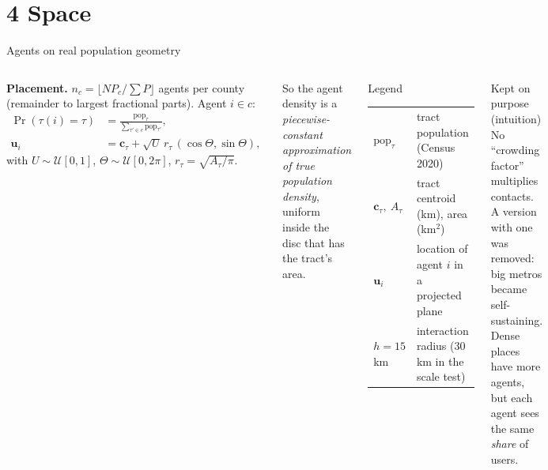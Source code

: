 ﻿\documentclass[9pt,aspectratio=169]{beamer}
\newenvironment{kept}{\begin{exampleblock}{Kept on purpose (intuition)}\small}{\end{exampleblock}}
\newenvironment{legend}{\begin{block}{Legend}\scriptsize}{\end{block}}
\begin{document}
\section{4 Space}
\begin{frame}{Agents on real population geometry}
 \begin{columns}[T]
 \textbf{Placement.} $n_c=\big\lfloor N P_c/\sum P\big\rfloor$ agents per county (remainder to largest fractional parts). Agent $i\in c$:
 \begin{align*}
 \Pr(\tau(i)=\tau)&=\frac{\mathrm{pop}_\tau}{\sum_{\tau'\in c}\mathrm{pop}_{\tau'}},\\
 \bm u_i&=\bm c_\tau+\sqrt{U}\,r_\tau\,(\cos\Theta,\sin\Theta),
 \end{align*}
 with $U\sim\mathcal U[0,1]$, $\Theta\sim\mathcal U[0,2\pi]$, $r_\tau=\sqrt{A_\tau/\pi}$.
 \par\smallskip
 So the agent density is a \emph{piecewise-constant approximation of true population density}, uniform inside the disc that has the tract's area.
 \begin{legend}
 \begin{tabular}{@{}p{1.1cm}p{5.2cm}@{}}
 $\mathrm{pop}_\tau$ & tract population (Census 2020)\\
 $\bm c_\tau,\ A_\tau$ & tract centroid (km), area (km$^2$)\\
 $\bm u_i$ & location of agent $i$ in a projected plane\\
 $h=15$ km & interaction radius (30 km in the scale test)
 \end{tabular}
 \end{legend}
 \begin{kept}
  No ``crowding factor'' multiplies contacts. A version with one was removed: big metros became self-sustaining. Dense places have more agents, but each agent sees the same \emph{share} of users.
 \end{kept}
 \end{columns}
\end{frame}
\end{document}
